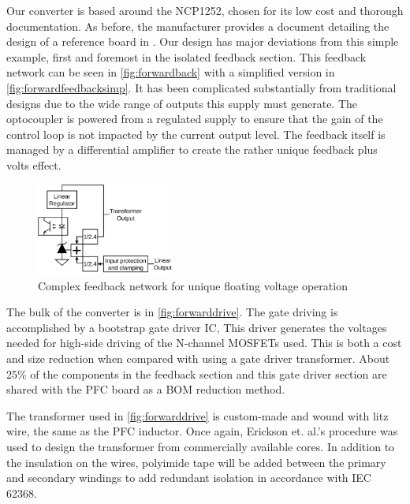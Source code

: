 \documentclass[15pt]{article}
\begin{document}
Our converter is based around the NCP1252, chosen for its low cost and thorough documentation. As before, the manufacturer provides a document detailing the design of a reference board in \cite{9}. Our design has major deviations from this simple example, first and foremost in the isolated feedback section. This feedback network can be seen in \autoref{fig:forwardback} with a simplified version in \autoref{fig:forwardfeedbacksimp}. It has been complicated substantially from traditional designs due to the wide range of outputs this supply must generate. The optocoupler is powered from a regulated supply to ensure that the gain of the control loop is not impacted by the current output level. The feedback itself is managed by a differential amplifier to create the rather unique feedback plus volts effect.

\begin{figure}[H]
    \begin{center}
    \includegraphics[width=0.4\textwidth]{forwardfeedbacksimp}
    \end{center}
    \caption{Complex feedback network for unique floating voltage operation}
    \label{fig:forwardfeedbacksimp}
\end{figure}

The bulk of the converter is in \autoref{fig:forwarddrive}. The gate driving is accomplished by a bootstrap gate driver IC, This driver generates the voltages needed for high-side driving of the N-channel MOSFETs used. This is both a cost and size reduction when compared with using a gate driver transformer. About 25\% of the components in the feedback section and this gate driver section are shared with the PFC board as a BOM reduction method.

The transformer used in \autoref{fig:forwarddrive} is custom-made and wound with litz wire, the same as the PFC inductor. Once again, Erickson et. al.’s\cite{2} procedure was used to design the transformer from commercially available cores. In addition to the insulation on the wires, polyimide tape will be added between the primary and secondary windings to add redundant isolation in accordance with IEC 62368\cite{5}.
\end{document}

